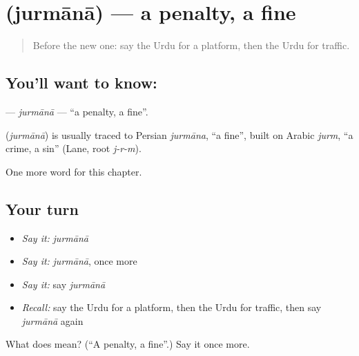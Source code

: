 \section[\texorpdfstring{\ur{جرمانہ} (jurmānā)}{جرمانہ (jurmānā)}]{ (jurmānā) — a penalty, a fine}

\label{lesson:UR-C255-jurmana}



\begin{quote}
Before the new one: say the Urdu for a platform, then the Urdu for traffic.
\end{quote}

\subsection*{You'll want to know: }
\textbf{} — \emph{jurmānā} — \textquotedblleft{}a penalty, a fine\textquotedblright{}.

\begin{cousinweb}
\textbf{} (\emph{jurmānā}) is usually traced to Persian \emph{jurmāna}, \textquotedblleft{}a fine\textquotedblright{}, built on Arabic \emph{jurm}, \textquotedblleft{}a crime, a sin\textquotedblright{} (Lane, root \emph{j-r-m}).
\end{cousinweb}

\begin{grammarlens}[title={What you've built}]
One more word for this chapter.
\end{grammarlens}

\subsection*{Your turn}
\begin{itemize}
\raggedright
  \item \emph{Say it:} \emph{jurmānā}
  \item \emph{Say it:} \emph{jurmānā}, once more
  \item \emph{Say it:} say \emph{jurmānā}
  \item \emph{Recall:} say the Urdu for a platform, then the Urdu for traffic, then say \emph{jurmānā} again
\end{itemize}

\begin{tcolorbox}[breakable,colback=teal!4,colframe=teal!35!black,title={Before you move on}]
What does  mean? (\textquotedblleft{}A penalty, a fine\textquotedblright{}.) Say it once more.
\end{tcolorbox}
